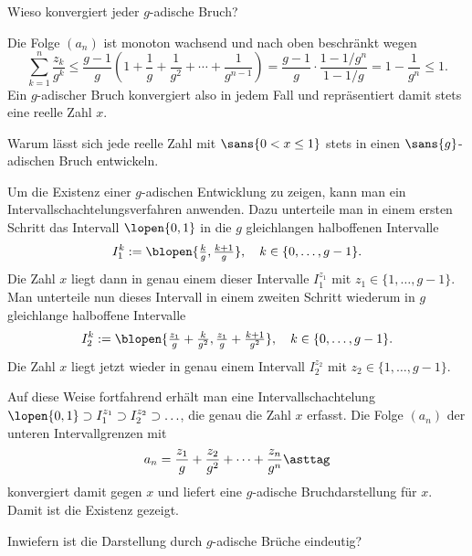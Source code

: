 \begin{frage}
  Wieso konvergiert jeder $g$-adische Bruch?
\end{frage}

\begin{antwort}
  Die Folge $(a_n)$ ist monoton wachsend und nach oben beschränkt wegen
  \[
  \sum_{k=1}^n \frac{z_k}{g^k}
  \le \frac{g-1}{g} \left(1+\frac{1}{g}+\frac{1}{g^2}+\cdots +
    \frac{1}{g^{n-1}} \right) = \frac{g-1}{g}\cdot 
  \frac{1-1/g^n}{1-1/g}=1-\frac{1}{g^{n}} \le 1. 
  \]
  Ein $g$-adischer Bruch konvergiert also in jedem Fall und repräsentiert 
  damit stets eine reelle Zahl $x$.\AntEnd 
\end{antwort}

\begin{frage}\label{02_gala}
  Warum lässt sich jede reelle Zahl mit 
  $\sans{0<x\le 1}$ stets in einen $\sans{g}$-adischen 
  Bruch entwickeln. 
\end{frage}

\begin{antwort}
  Um die Existenz einer $g$-adischen Entwicklung zu zeigen, kann man ein 
  Intervallschachtelungsverfahren anwenden. Dazu unterteile 
  man in einem ersten Schritt das Intervall 
  $\lopen{0,1}$ in die $g$ gleichlangen 
  halboffenen Intervalle 
  \[
  I^k_1 := \blopen{ \tfrac{k}{g}, \tfrac{k+1}{g}  }, 
  \quad k \in \{ 0,\ldots, g-1 \}. 
  \]
  Die Zahl $x$ liegt dann in genau einem dieser Intervalle 
  $I^{z_1}_1$ mit $z_1\in\{1,\ldots,g-1\}$. 
  Man unterteile nun dieses Intervall 
  in einem zweiten Schritt 
  wiederum in $g$ gleichlange halboffene Intervalle  
  \[
  I^k_2:=\blopen{\tfrac{z_1}{g}+\tfrac{k}{g^2}, 
    \tfrac{z_1}{g}+\tfrac{k+1}{g^2} },
  \quad k \in \{ 0,\ldots, g-1 \}. 
  \]
  Die Zahl $x$ liegt jetzt wieder in genau einem Intervall 
  $I^{z_2}_2$ mit $z_2\in\{1,\ldots,g-1\}$.  
  
  Auf diese Weise fortfahrend erhält man eine Intervallschachtelung 
  $\lopen{0,1}\supset I^{z_1}_1\supset I^{z_2}_2 \supset \ldots$, 
  die genau die Zahl $x$ erfasst. 
  Die Folge $(a_n)$ der unteren Intervallgrenzen mit 
  \[
  a_n=\frac{z_1}{g}+\frac{z_2}{g^2}+\cdots+\frac{z_n}{g^n}\asttag
  \]
  konvergiert damit gegen $x$ und liefert eine $g$-adische Bruchdarstellung 
  für $x$. Damit ist die Existenz gezeigt. \AntEnd
\end{antwort}

\begin{frage}
  Inwiefern ist die Darstellung durch $g$-adische Brüche eindeutig?
\end{frage}

